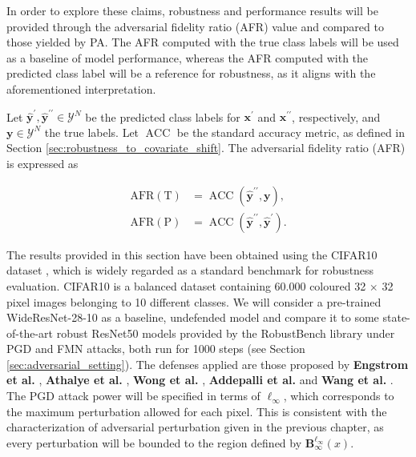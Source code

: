 In order to explore these claims, robustness and performance results will be
provided through the adversarial fidelity ratio (AFR) value and compared to those
yielded by PA. The AFR computed with the true class labels will be used as a baseline
of model performance, whereas the AFR computed with the predicted class label
will be a reference for robustness, as it aligns with the aforementioned
interpretation.

\begin{definition}
    Let $\bm{\hat{y}^\prime}, \bm{\hat{y}^{\prime\prime}} \in \mathcal{Y}^N$ be the predicted class 
    labels for $\bm{x}^\prime$ and $\bm{x}^{\prime \prime}$, respectively, 
    and $\bm{y}\in \mathcal{Y}^N$ the true labels. Let $\operatorname{ACC}$ be the standard accuracy 
    metric, as defined in Section \ref{sec:robustness_to_covariate_shift}.
    The adversarial fidelity ratio (AFR) is expressed as

    $$
    \begin{aligned}
        \operatorname{AFR (T)} &= \operatorname{ACC}(\bm{\hat{y}^{\prime \prime}}, \bm{y}), \\
        \operatorname{AFR (P)} &= \operatorname{ACC}(\bm{\hat{y}^{\prime \prime}}, \bm{\hat{y}^{\prime}}).
    \end{aligned}
    $$

\end{definition}

The results provided in this section have been obtained using the CIFAR10 dataset
\cite{krizhevskyLearningMultipleLayers},
which is widely regarded as a standard benchmark for robustness evaluation. CIFAR10 is
a balanced dataset containing 60.000 coloured 32 $\times$ 32 pixel images belonging to 10
different classes. We will consider a pre-trained WideResNet-28-10
\cite{BMVC2016_87}
as a baseline, undefended model and compare it to some state-of-the-art robust ResNet50
\cite{resnet50}
models provided by the 
RobustBench \cite{croceRobustBenchStandardizedAdversarial2021a}
library under PGD \cite{madryDeepLearningModels2019}
and FMN \cite{pintorFastMinimumnormAdversarial2021}
attacks, both run for 1000 steps (see Section \ref{sec:adversarial_setting}).
The defenses applied are those proposed by 
{\color{tab:blue} \textbf{Engstrom et al.}} \cite{engstrom2019adversarial}, 
{\color{tab:green} \textbf{Athalye et al.}} \cite{AthalyeC018}, 
{\color{tab:red} \textbf{Wong et al.}} \cite{WongRK20}, 
{\color{tab:purple} \textbf{Addepalli et al.}} \cite{Addepalli2022ScalingAT}
and {\color{tab:brown} \textbf{Wang et al.}} \cite{wang2023betterdiffusionmodelsimprove}.
The PGD attack power will be specified in terms of $\ell_\infty$, which corresponds
to the maximum perturbation allowed for each pixel. This is consistent with the characterization
of adversarial perturbation given in the previous chapter, as every perturbation will be bounded
to the region defined by $\mathbf{B}_\infty^{\ell_{\infty}} (x)$.

